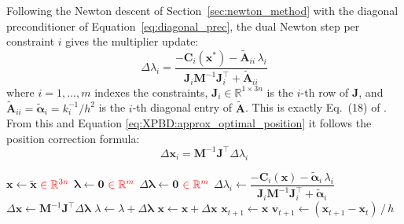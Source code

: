 \documentclass{article}
\newcommand{\red}[1]{\textcolor{red}{#1}}
\begin{document}
\noindent Following the Newton descent of Section~\ref{sec:newton_method} with the diagonal preconditioner of Equation~\ref{eq:diagonal_prec}, the dual Newton step per constraint $i$ gives the multiplier update:
\begin{equation}
\label{eq:XPBD:delta_lambda_correction}
    \Delta\lambda_i = 
    \frac{-\mathbf{C}_i(\mathbf{x}^*) - \tilde{\mathbf{A}}_{ii}\,\lambda_i}
    {\mathbf{J}_i\mathbf{M}^{-1}\mathbf{J}_i^\top + \tilde{\mathbf{A}}_{ii}}
\end{equation}
%
where $i = 1,\dots,m$ indexes the constraints, $\mathbf{J}_i \in \mathbb{R}^{1 \times 3n}$ 
is the $i$-th row of $\mathbf{J}$, and $\tilde{\mathbf{A}}_{ii} = \tilde{\boldsymbol{\alpha}}_i = k_i^{-1}/h^2$ is the 
$i$-th diagonal entry of $\tilde{\mathbf{A}}$. This is exactly Eq.~(18) of 
\cite{macklin2016xpbd}. From this and Equation \ref{eq:XPBD:approx_optimal_position} it follows the position correction formula:
\begin{equation}
\label{eq:XPBD:delta_position_correction}
    \Delta \mathbf{x}_i = \mathbf{M}^{-1}\mathbf{J}^\top\Delta \lambda_i
\end{equation}

\begin{algorithm}[H]
\caption{XPBD Time Step}
\begin{algorithmic}[1]
    \State $\mathbf{x} \gets \tilde{\mathbf{x}}$ \hfill $\red{\in \mathbb{R}^{3n}}$
    \State $\boldsymbol{\lambda} \gets \mathbf{0}$ \hfill $\red{\in \mathbb{R}^{m}}$
        \State $\Delta\boldsymbol{\lambda} \gets \mathbf{0}$ \hfill $\red{\in \mathbb{R}^{m}}$
            \State $\Delta\lambda_i \gets 
                \dfrac{-\mathbf{C}_i(\mathbf{x}) - \tilde{\boldsymbol{\alpha}}_{i}\,\lambda_i}
                      {\mathbf{J}_i\mathbf{M}^{-1}\mathbf{J}_i^\top + \tilde{\boldsymbol{\alpha}}_{i}}$
        \EndFor
        \State $\Delta \mathbf{x} \gets \mathbf{M}^{-1}\mathbf{J}^\top\Delta\boldsymbol{\lambda}$
        \State $\lambda \gets \lambda + \Delta\boldsymbol{\lambda}$
        \State $\mathbf{x} \gets \mathbf{x} + \Delta \mathbf{x}$
    \EndFor
    \State $\mathbf{x}_{t+1} \gets \mathbf{x}$
    \State $\mathbf{v}_{t+1} \gets (\mathbf{x}_{t+1} - \mathbf{x}_t) \,/\, h$
\EndFunction
\end{algorithmic}
\end{algorithm}
\end{document}
